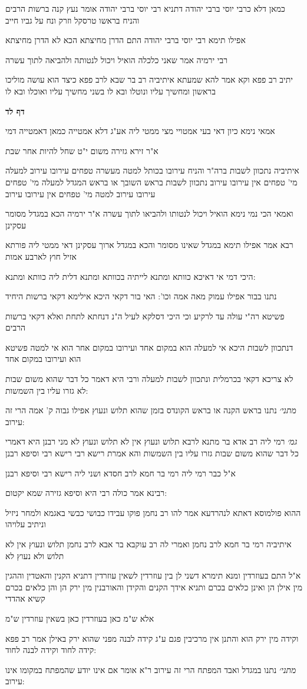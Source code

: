 \documentclass[12pt, openany]{book}
\newcommand{\sethebfont}{
\fontsize{10.5pt}{21.0pt} \selectfont
}
\newcommand{\textblock}[1]{
{\sethebfont #1\\}	
}
\newcommand{\sectname}{}
\newcommand{\newsection}[1]{
	\addcontentsline{toc}{section}{#1}
	\renewcommand{\sectname}{#1}	
	\vspace{-\baselineskip}
	\begin{center}
		\textbf{%
\fontsize{16pt}{16pt}\selectfont
			#1}
	\end{center}
	\vspace{-\baselineskip}
	\nopagebreak
}
\begin{document}
\textblock{כמאן דלא כרבי יוסי ברבי יהודה דתניא רבי יוסי ברבי יהודה אומר נעץ קנה ברשות הרבים והניח בראשו טרסקל וזרק ונח על גביו חייב}
\textblock{אפילו תימא רבי יוסי ברבי יהודה התם הדרן מחיצתא הכא לא הדרן מחיצתא}
\textblock{רבי ירמיה אמר שאני כלכלה הואיל ויכול לנטותה ולהביאה לתוך עשרה}
\textblock{יתיב רב פפא וקא אמר להא שמעתא איתיביה רב בר שבא לרב פפא כיצד הוא עושה מוליכו בראשון ומחשיך עליו ונוטלו ובא לו בשני מחשיך עליו ואוכלו ובא לו}
\newsection{דף לד}
\textblock{אמאי נימא כיון דאי בעי אמטויי מצי ממטי ליה אע"ג דלא אמטייה כמאן דאמטייה דמי}
\textblock{א"ר זירא גזירה משום י"ט שחל להיות אחר שבת}
\textblock{איתיביה נתכוון לשבות ברה"ר והניח עירובו בכותל למטה מעשרה טפחים עירובו עירוב למעלה מי' טפחים אין עירובו עירוב נתכוון לשבות בראש השובך או בראש המגדל למעלה מי' טפחים עירובו עירוב למטה מי' טפחים אין עירובו עירוב}
\textblock{ואמאי הכי נמי נימא הואיל ויכול לנטותו ולהביאו לתוך עשרה א"ר ירמיה הכא במגדל מסומר עסקינן}
\textblock{רבא אמר אפילו תימא במגדל שאינו מסומר והכא במגדל ארוך עסקינן דאי ממטי ליה פורתא אזיל חוץ לארבע אמות}
\textblock{היכי דמי אי דאיכא כוותא ומתנא לייתיה בכוותא ומתנא דלית ליה כוותא ומתנא:}
\textblock{נתנו בבור אפילו עמוק מאה אמה וכו': האי בור דקאי היכא אילימא דקאי ברשות היחיד}
\textblock{פשיטא רה"י עולה עד לרקיע וכי היכי דסלקא לעיל ה"נ דנחתא לתחת ואלא דקאי ברשות הרבים}
\textblock{דנתכוון לשבות היכא אי למעלה הוא במקום אחד ועירובו במקום אחר הוא אי למטה פשיטא הוא ועירובו במקום אחד}
\textblock{לא צריכא דקאי בכרמלית ונתכוון לשבות למעלה ורבי היא דאמר כל דבר שהוא משום שבות לא גזרו עליו בין השמשות:}
\textblock{{\large\emph{מתני׳}} נתנו בראש הקנה או בראש הקונדס בזמן שהוא תלוש ונעוץ אפילו גבוה ק' אמה הרי זה עירוב:}
\textblock{{\large\emph{גמ׳}} רמי ליה רב אדא בר מתנא לרבא תלוש ונעוץ אין לא תלוש ונעוץ לא מני רבנן היא דאמרי כל דבר שהוא משום שבות גזרו עליו בין השמשות והא אמרת רישא רבי רישא רבי וסיפא רבנן}
\textblock{א"ל כבר רמי ליה רמי בר חמא לרב חסדא ושני ליה רישא רבי וסיפא רבנן}
\textblock{רבינא אמר כולה רבי היא וסיפא גזירה שמא יקטום:}
\textblock{ההוא פולמוסא דאתא לנהרדעא אמר להו רב נחמן פוקו עבידו כבושי כבשי באגמא ולמחר ניזיל וניתיב עלויהו}
\textblock{איתיביה רמי בר חמא לרב נחמן ואמרי לה רב עוקבא בר אבא לרב נחמן תלוש ונעוץ אין לא תלוש ולא נעוץ לא}
\textblock{א"ל התם בעוזרדין ומנא תימרא דשני לן בין עוזרדין לשאין עוזרדין דתניא הקנין והאטדין וההגין מין אילן הן ואינן כלאים בכרם ותניא אידך הקנים והקידן והאורבנין מין ירק הן והן כלאים בכרם קשיא אהדדי}
\textblock{אלא ש"מ כאן בעוזרדין כאן בשאין עוזרדין ש"מ}
\textblock{וקידה מין ירק הוא והתנן אין מרכיבין פגם ע"ג קידה לבנה מפני שהוא ירק באילן אמר רב פפא קידה לחוד וקידה לבנה לחוד:}
\textblock{{\large\emph{מתני׳}} נתנו במגדל ואבד המפתח הרי זה עירוב ר"א אומר אם אינו יודע שהמפתח במקומו אינו עירוב:}
\end{document}
